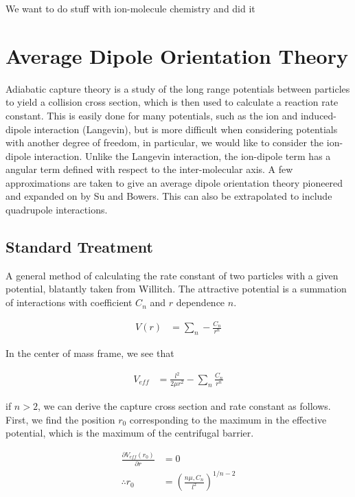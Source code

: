 We want to do stuff with ion-molecule chemistry and did it

\section{Average Dipole Orientation Theory}

Adiabatic capture theory is a study of the long range potentials between particles to yield a collision cross section, which is then used to calculate a reaction rate constant. This is easily done for many potentials, such as the ion and induced-dipole interaction (Langevin), but is more difficult when considering potentials with another degree of freedom, in particular, we would like to consider the ion-dipole interaction. Unlike the Langevin interaction, the ion-dipole term has a angular term defined with respect to the inter-molecular axis. A few approximations are taken to give an average dipole orientation theory pioneered and expanded on by Su and Bowers.\cite{Su1973, Su1973a} This can also be extrapolated to include quadrupole interactions.\cite{Su1975}

\subsection{Standard Treatment}
A general method of calculating the rate constant of two particles with a given potential, blatantly taken from Willitch.\cite{Zhang2017} The attractive potential is a summation of interactions with coefficient $C_n$ and $r$ dependence $n$.

\begin{align}
    V(r) & = \sum_n -\frac{C_n}{r^n}
\end{align}

In the center of mass frame, we see that

\begin{align}
    V_{eff} & = \frac{l^2}{2 \mu r^2} - \sum_n \frac{C_n}{r^n}\label{eq: veff}
\end{align}

if $n > 2$, we can derive the capture cross section and rate constant as follows. First, we find the position $r_0$ corresponding to the maximum in the effective potential, which is the maximum of the centrifugal barrier.

\begin{align*}
    \frac{\partial V_{eff}(r_0)}{\partial r} & = 0 \\
    \therefore r_0 & = \left(\frac{n \mu, C_n}{l^2}\right)^{1/n-2}
\end{align*}

